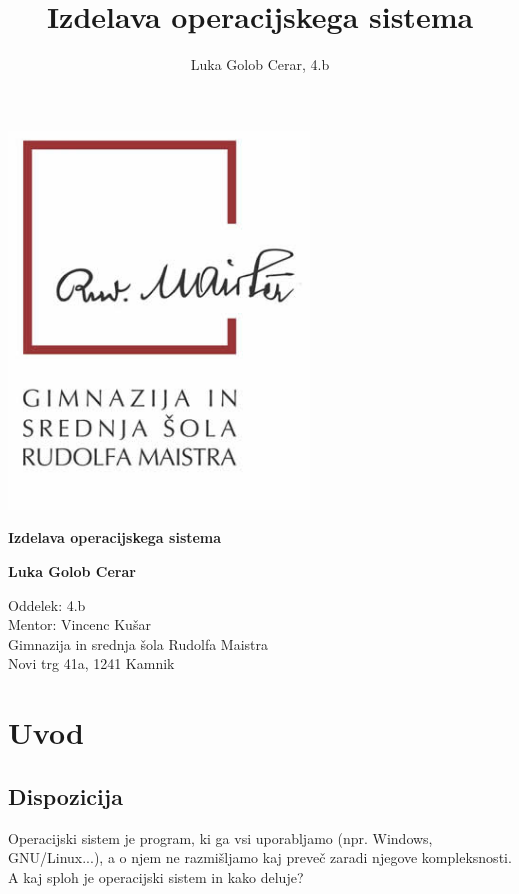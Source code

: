 \documentclass{report}
\title{Izdelava operacijskega sistema}
\author{Luka Golob Cerar, 4.b}
\affil{Mentor: Vincenc Kušar}
\begin{document}
\begin{titlepage}
   \begin{center}
       \hspace*{1.5cm}\includegraphics[width=0.6\textwidth]{gssrm}

       \textbf{Izdelava operacijskega sistema}

       \vspace{1.5em}

       \textbf{Luka Golob Cerar}

       \vfill
            
       Oddelek: 4.b\\
       Mentor: Vincenc Kušar\\
       Gimnazija in srednja šola Rudolfa Maistra\\
       Novi trg 41a, 1241 Kamnik
   \end{center}
\end{titlepage}

\tableofcontents

\chapter{Uvod}

\section{Dispozicija}
Operacijski sistem je program, ki ga vsi uporabljamo (npr. Windows, GNU/Linux...), a o njem ne razmišljamo kaj preveč zaradi njegove kompleksnosti. A kaj sploh je operacijski sistem in kako deluje?
\end{document}
